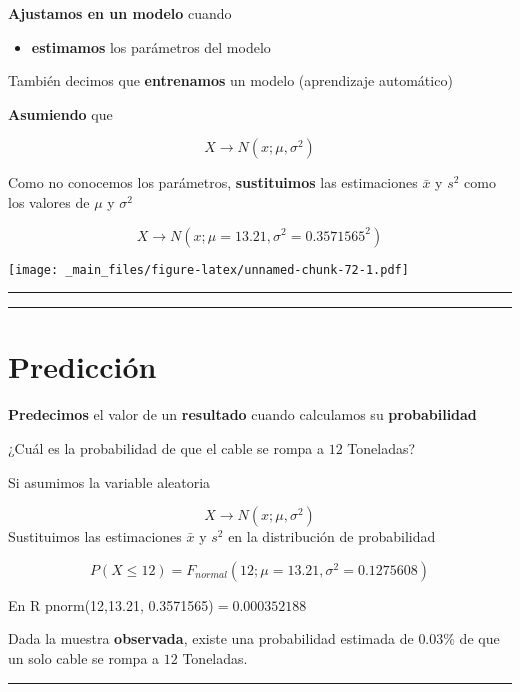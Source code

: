 \documentclass[
]{book}
\providecommand{\tightlist}{%
  \setlength{\itemsep}{0pt}\setlength{\parskip}{0pt}}
\begin{document}
\textbf{Ajustamos en un modelo} cuando

\begin{itemize}
\tightlist
\item
  \textbf{estimamos} los parámetros del modelo
\end{itemize}

También decimos que \textbf{entrenamos} un modelo (aprendizaje automático)

\textbf{Asumiendo} que

\[X \rightarrow N(x; \mu, \sigma^2)\]

Como no conocemos los parámetros, \textbf{sustituimos} las estimaciones \(\bar{x}\) y \(s^2\) como los valores de \(\mu\)
y \(\sigma^2\)

\[X \rightarrow N(x; \mu=13.21, \sigma^2=0.3571565^2)\]

\texttt{[image: \_main\_files/figure-latex/unnamed-chunk-72-1.pdf]}

\begin{center}\rule{0.5\linewidth}{0.5pt}\end{center}

\begin{center}\rule{0.5\linewidth}{0.5pt}\end{center}

\hypertarget{predicciuxf3n}{%
\section{Predicción}\label{predicciuxf3n}}

\textbf{Predecimos} el valor de un \textbf{resultado} cuando calculamos su \textbf{probabilidad}

¿Cuál es la probabilidad de que el cable se rompa a \(12\) Toneladas?

Si asumimos la variable aleatoria

\[X \rightarrow N(x; \mu, \sigma^2)\]
Sustituimos las estimaciones \(\bar{x}\) y \(s^2\) en la distribución de probabilidad

\[P(X \leq 12)= F_{normal}(12; \mu=13.21, \sigma^2=0.1275608)\]

En R pnorm(12,13.21, 0.3571565)\(=0.000352188\)

Dada la muestra \textbf{observada}, existe una probabilidad estimada de \(0.03\%\) de que un solo cable se rompa a \(12\) Toneladas.

\begin{center}\rule{0.5\linewidth}{0.5pt}\end{center}
\end{document}
